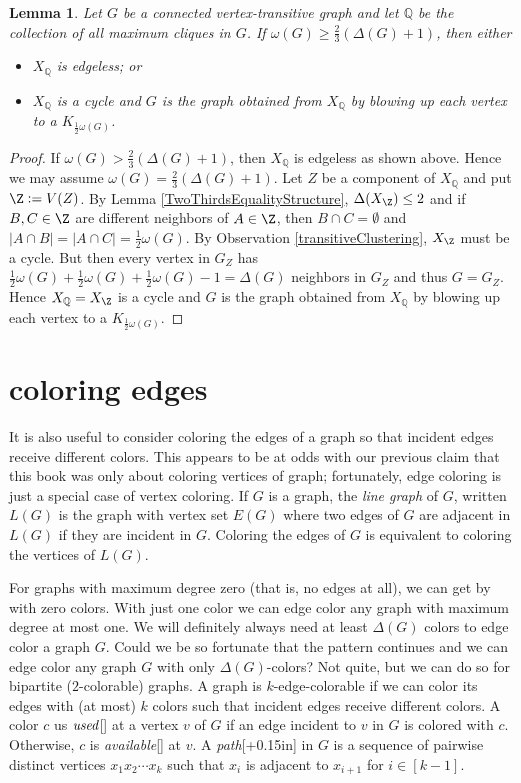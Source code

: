 \documentclass{amsbook}
\newcommand{\aaside}[2]{\marginnote{\scriptsize{#1}}[#2]}
\theoremstyle{plain}
\newtheorem{lemma}{Lemma}
\numberwithin{equation}{chapter}
\newcommand{\card}[1]{\left|#1\right|}
\newcommand{\irange}[1]{\left[#1\right]}
\newcommand{\parens}[1]{\left( #1 \right)}
\newcommand{\DefinedAs}{\mathrel{\mathop:}=}
\newcommand{\Q}{\mathbb{Q}}
\begin{document}
\begin{lemma}\label{TransitiveClusteringBigCliques}
Let $G$ be a connected vertex-transitive graph and let $\Q$ be the collection
of all maximum cliques in $G$.  If $\omega(G) \ge \frac23 \parens{\Delta(G) +
1}$, then either
\begin{itemize}
\item $X_\Q$ is edgeless; or
\item $X_\Q$ is a cycle and $G$ is the graph obtained from $X_\Q$ by blowing up each vertex to a $K_{\frac12 \omega(G)}$.
\end{itemize}
\end{lemma}
\begin{proof}
If $\omega(G) > \frac23 \parens{\Delta(G) + 1}$, then $X_\Q$ is edgeless as shown above.  Hence we may assume $\omega(G) = \frac23 \parens{\Delta(G) + 1}$.  
Let $Z$ be a component of $X_\Q$ and put $\Z \DefinedAs V(Z)$.
By Lemma \ref{TwoThirdsEqualityStructure}, $\Delta(X_\Z) \le 2$ and if $B, C \in \Z$ are 
different neighbors of $A \in \Z$, then $B \cap C = \emptyset$ and $\card{A \cap B} = \card{A \cap C} = \frac12 \omega(G)$.  
By Observation \ref{transitiveClustering}, $X_\Z$ must be a cycle.  But then every vertex in $G_Z$ has 
$\frac12 \omega(G) + \frac12 \omega(G) + \frac12 \omega(G) - 1 = \Delta(G)$ neighbors in $G_Z$ and thus $G = G_Z$.  
Hence $X_\Q = X_\Z$ is a cycle and $G$ is the graph obtained from $X_\Q$ by blowing up each vertex to a $K_{\frac12 \omega(G)}$.
\end{proof}


\chapter*{coloring edges}
It is also useful to consider coloring the edges of a graph so that incident edges receive different colors.  This
appears to be at odds with our previous claim that this book was only about coloring vertices of graph; fortunately, edge coloring
is just a special case of vertex coloring.  If $G$ is a graph, the \emph{line graph} of $G$, written
$L(G)$ is the graph with vertex set $E(G)$ where two edges of $G$ are adjacent in $L(G)$ if they are incident in $G$.  Coloring
the edges of $G$ is equivalent to coloring the vertices of $L(G)$.

For graphs with maximum degree zero (that is, no edges at all), we can get by with zero colors.  
With just one color we can edge color any graph with maximum degree at most one.  We will definitely always need at least $\Delta(G)$ colors
to edge color a graph $G$.  Could we be so fortunate that the pattern continues
and we can edge color any graph $G$ with only $\Delta(G)$-colors? Not quite, but we can do so for bipartite ($2$-colorable) graphs.
A graph is $k$-edge-colorable if we can color its edges with (at most) $k$ colors such that incident edges receive different colors.
A color $c$ us $\emph{used}$\aaside{used}{} at a vertex $v$ of $G$ if an edge incident to $v$ in $G$ is colored with $c$. Otherwise, $c$ is \emph{available}\aaside{available}{} at $v$.
A \emph{path}\aaside{path}{+0.15in} in $G$ is a sequence of pairwise distinct vertices $x_1x_2\cdots x_k$ such that $x_i$ is adjacent to $x_{i+1}$ for $i \in \irange{k-1}$.
\end{document}
